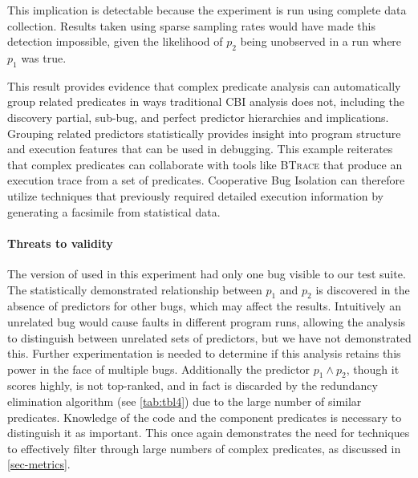This implication is detectable because the experiment is run using complete data collection.  Results taken using sparse sampling rates would have made this detection impossible, given the likelihood of $p_2$ being unobserved in a run where $p_1$ was true.

This result provides evidence that complex predicate analysis can automatically group related predicates in ways traditional CBI analysis does not, including the discovery partial, sub-bug, and perfect predictor hierarchies and implications.  Grouping related predictors statistically provides insight into program structure and execution features that can be used in debugging.  This example reiterates that complex predicates can collaborate with tools like \textsc{BTrace} that produce an execution trace from a set of predicates.  Cooperative Bug Isolation can therefore utilize techniques that previously required detailed execution information by generating a facsimile from statistical data.

\paragraph{Threats to validity}

The version of  used in this experiment had only one bug visible to our test suite.  The statistically demonstrated relationship between $p_1$ and $p_2$ is discovered in the absence of predictors for other bugs, which may affect the results.  Intuitively an unrelated bug would cause faults in different program runs, allowing the analysis to distinguish between unrelated sets of predictors, but we have not demonstrated this.  Further experimentation is needed to determine if this analysis retains this power in the face of multiple bugs.  Additionally the predictor $p_1 \wedge p_2$, though it scores highly, is not top-ranked, and in fact is discarded by the redundancy elimination algorithm (see \autoref{tab:tbl4}) due to the large number of similar predicates.  Knowledge of the code and the component predicates is necessary to distinguish it as important.  This once again demonstrates the need for techniques to effectively filter through large numbers of complex predicates, as discussed in \autoref{sec-metrics}.

